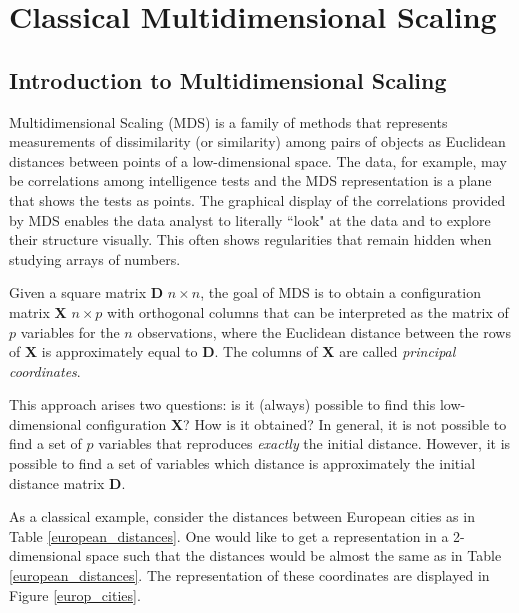 \documentclass[11pt]{report}
\begin{document}
\chapter{Classical Multidimensional Scaling}
\section{Introduction to Multidimensional Scaling}
Multidimensional Scaling (MDS) is a family of methods that represents 
measurements of dissimilarity (or similarity) among pairs of objects as 
Euclidean distances between points of a low-dimensional space. The data, 
for example, may be correlations among intelligence tests and the MDS 
representation is a plane that shows the tests as points. The graphical display 
of the correlations provided by MDS enables the data analyst to literally 
``look" at the data and to explore their structure visually. This often shows 
regularities that remain hidden when studying arrays of numbers. 

\indent Given a square matrix \textbf{D} $n\times n$, the goal of MDS is to 
obtain a configuration matrix \textbf{X} $n \times p$ with orthogonal columns
that can be interpreted as the matrix of $p$ variables for the $n$ 
observations, where the Euclidean distance between the rows of \textbf{X} 
is approximately equal to \textbf{D}. The columns of \textbf{X} are called 
\textit{principal coordinates}.

\indent This approach arises two questions: is it (always) possible to find this
low-dimensional configuration \textbf{X}? How is it obtained? In general, it 
is not possible to find a set of $p$ variables that reproduces 
\textit{exactly} the initial distance. However, it is possible to find a set 
of variables which distance is approximately the initial distance matrix 
\textbf{D}.


\indent As a classical example, consider the distances between European cities 
as in Table \ref{european_distances}. One would like to get a 
representation in a 2-dimensional space such that the distances would be 
almost the same as in  Table \ref{european_distances}. The representation 
of these coordinates are displayed in Figure \ref{europ_cities}.
\end{document}
